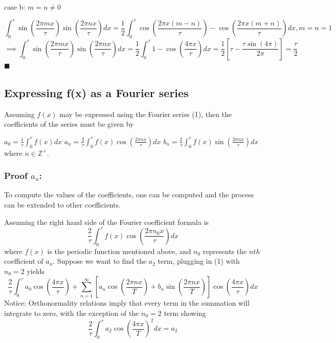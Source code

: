 \documentclass{article}
\begin{document}
case b: $m = n \ne 0$ 

\begin{equation*}
	\int_{0}^{\tau} \sin(\frac{2\pi mx}{\tau})\sin(\frac{2\pi nx}{\tau})dx = 	\frac{1}{2}\int_{0}^{\tau} \cos(\frac{2\pi x(m-n)}{\tau})-\cos(\frac{2\pi x(m+n)}{\tau}) dx, m = n = 1
\end{equation*}
\begin{equation*}
	\implies \int_{0}^{\tau} \sin(\frac{2\pi mx}{\tau})\sin(\frac{2\pi nx}{\tau})dx =  \frac{1}{2}\int_{0}^{\tau} 1-\cos(\frac{4\pi x}{\tau}) dx = \frac{1}{2}[\tau-\frac{\tau\sin(4\pi)}{2\pi}]=\frac{\tau}{2} 
\end{equation*}
$\blacksquare$ 

\subsection{Expressing f(x) as a Fourier series}
Assuming $f(x)$ may be expressed using the Fourier series (1), then the coefficients of the series must be given by 

$a_{0}=\frac{1}{\tau} \int_{0}^{\tau} f(x) dx$															$a_{n}=\frac{2}{\tau} \int_{0}^{\tau} f(x)\cos(\frac{2\pi nx}{\tau}) dx$															$b_{n}=\frac{2}{\tau} \int_{0}^{\tau} f(x)\sin(\frac{2\pi nx}{\tau}) dx$
where $n \in \mathbb{Z}^{+}$. 

\subsubsection{Proof $a_n$:}
To compute the values of the coefficients, one can be computed and the process can be extended to other coefficients.

Assuming the right hand side of the Fourier coefficient formula is 
\begin{equation*}
	\frac{2}{\tau} \int_{0}^{\tau} f(x)\cos(\frac{2\pi n_{0}x}{\tau}) dx
\end{equation*}
where $f(x)$ is the periodic function mentioned above, and $n_0$ represents the $nth$ coefficient of $a_n$. Suppose we want to find the $a_2$ term, plugging in (1) with $n_0 = 2$ yields
\begin{equation*}
	\frac{2}{\tau} \int_{0}^{\tau} 
    a_{0} \cos(\frac{4\pi x}{\tau})+\sum_{n=1}^{\infty} [a_{n} \cos(\frac{2\pi nx}{T})+b_{n} \sin(\frac{2\pi nx}{T})] \cos(\frac{4\pi x}{\tau}) dx
\end{equation*}
Notice: Orthonormality relations imply that every term in the summation will integrate to zero, with the exception of the $n_0 = 2$ term showing
\begin{equation*}
	\frac{2}{\tau} \int_{0}^{\tau} a_{2}\cos(\frac{4\pi x} {T})^2 dx = a_2\end{equation*}
\end{document}
